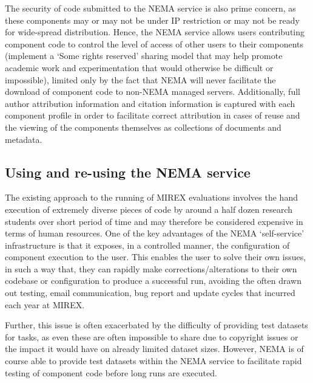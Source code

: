 \documentclass[conference]{IEEEtran}
\begin{document}
The security of code submitted to the NEMA service is also prime concern, as these components may or may not be under IP restriction or may not be ready for wide-spread distribution. Hence, the NEMA service allows users contributing component code to control the level of access of other users to their components (implement a `Some rights reserved' sharing model that may help promote academic work and experimentation that would otherwise be difficult or impossible), limited only by the fact that NEMA will never facilitate the download of component code to non-NEMA managed servers.
Additionally, full author attribution information and citation information is captured with each component profile in order to facilitate correct attribution in cases of reuse and the viewing of the components themselves as collections of documents and metadata. 

\subsection{Using and re-using the NEMA service}
The existing approach to the running of MIREX evaluations involves the hand execution of extremely diverse pieces of code by around a half dozen research students over short period of time and may therefore be considered expensive in terms of human resources.  One of the key advantages of the NEMA `self-service' infrastructure is that it exposes, in a controlled manner, the configuration of component execution to the user. This enables the user to solve their own issues, in such a way that, they can rapidly make corrections/alterations to their own codebase or configuration to produce a successful run, avoiding the often drawn out testing, email communication, bug report and update cycles that incurred each year at MIREX.
 
Further, this issue is often exacerbated by the difficulty of providing test datasets for tasks, as even these are often impossible to share due to copyright issues or the impact it would have on already limited dataset sizes. However, NEMA is of course able to provide test datasets within the NEMA service to facilitate rapid testing of component code before long runs are executed. \\
\end{document}
